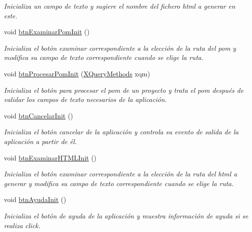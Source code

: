 \begin{DoxyCompactItemize}
\begin{DoxyCompactList}\small\item\em Inicializa un campo de texto y sugiere el nombre del fichero html a generar en este. \end{DoxyCompactList}\item 
void \mbox{\hyperlink{a00028_a8e25f512501551f46bb24a415036f15b}{btn\+Examinar\+Pom\+Init}} ()
\begin{DoxyCompactList}\small\item\em Inicializa el botón examinar correspondiente a la elección de la ruta del pom y modifica su campo de texto correspondiente cuando se elige la ruta. \end{DoxyCompactList}\item 
void \mbox{\hyperlink{a00028_a9bc18b3b0b00c0c7cd1e2852abefd3aa}{btn\+Procesar\+Pom\+Init}} (\mbox{\hyperlink{a00032}{X\+Query\+Methods}} xqm)
\begin{DoxyCompactList}\small\item\em Inicializa el botón para procesar el pom de un proyecto y trata el pom después de validar los campos de texto necesarios de la aplicación. \end{DoxyCompactList}\item 
void \mbox{\hyperlink{a00028_adddaf261f4abfb185dbaff370be28bef}{btn\+Cancelar\+Init}} ()
\begin{DoxyCompactList}\small\item\em Inicializa el botón cancelar de la aplicación y controla su evento de salida de la aplicación a partir de él. \end{DoxyCompactList}\item 
void \mbox{\hyperlink{a00028_aec83fb7dda0b4f2fdfc404ba2330b37a}{btn\+Examinar\+H\+T\+M\+L\+Init}} ()
\begin{DoxyCompactList}\small\item\em Inicializa el botón examinar correspondiente a la elección de la ruta del html a generar y modifica su campo de texto correspondiente cuando se elige la ruta. \end{DoxyCompactList}\item 
void \mbox{\hyperlink{a00028_a0b62d43fe793951471585f524b8963f0}{btn\+Ayuda\+Init}} ()
\begin{DoxyCompactList}\small\item\em Inicializa el botón de ayuda de la aplicación y muestra información de ayuda si se realiza click. \end{DoxyCompactList}\end{DoxyCompactItemize}
